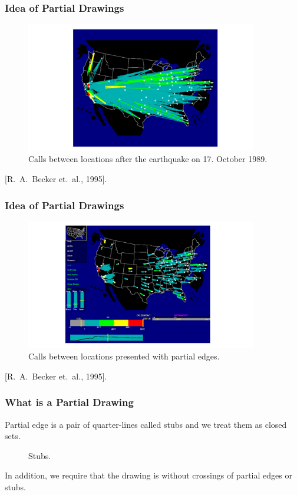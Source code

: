 \documentclass{beamer}
\begin{document}
\begin{frame}
\frametitle{Idea of Partial Drawings}
\begin{figure}[H]
\centering
\includegraphics[width=0.9\textwidth]{./figures/becker-slide-1.pdf}
\caption{Calls between locations after the earthquake on 17. October 1989.}
\end{figure}
\footnotesize{[R.\ A.\ Becker et.\ al., 1995].}
\end{frame}

\begin{frame}
\frametitle{Idea of Partial Drawings}
\begin{figure}[H]
\centering
\includegraphics[width=0.9\textwidth]{./figures/becker-slide-2.pdf}
\caption{Calls between locations presented with partial edges.}
\end{figure}
\footnotesize{[R.\ A.\ Becker et.\ al., 1995].}
\end{frame}

\begin{frame}
\frametitle{What is a Partial Drawing}
Partial edge is a pair of quarter-lines called stubs and we treat them as
closed sets.
\begin{figure}[H]
\centering

\caption{Stubs.}
\end{figure}

In addition, we require that the drawing is without crossings of partial
edges or stubs.
\begin{figure}[H]
\centering

\end{figure}
\end{frame}
\end{document}
